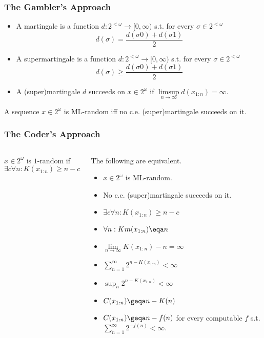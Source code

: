 \documentclass[UTF8,11pt,colorlinks,compress,openany]{beamer}%
\begin{document}
\begin{frame}\frametitle{The Gambler's Approach}
\begin{itemize}
	\item A martingale is a function $d: 2^{<\omega}\to[0,\infty)$ s.t. for every $\sigma\in 2^{<\omega}$
	\[d(\sigma)=\frac{d(\sigma0)+d(\sigma1)}{2}\]
	\item A supermartingale is a function $d: 2^{<\omega}\to[0,\infty)$ s.t. for every $\sigma\in 2^{<\omega}$
	\[d(\sigma)\geq\frac{d(\sigma0)+d(\sigma1)}{2}\]
	\item A (super)martingale $d$ succeeds on $x\in 2^\omega$ if $\limsup\limits_{n\to\infty}d(x_{1:n})=\infty$.
\end{itemize}
\begin{theorem}
A sequence $x\in 2^\omega$ is ML-random iff no c.e. (super)martingale succeeds on it.
\end{theorem}
\end{frame}

\begin{frame}\frametitle{The Coder's Approach}
\setlength\abovedisplayskip{0pt}
\setlength\belowdisplayskip{0pt}
\begin{columns}
\begin{definition}[$1$-Randomness]
$x\in 2^\omega$ is $1$-random if
\[\exists c\forall n: K(x_{1:n})\geq n-c\]
\end{definition}
\begin{theorem}
The following are equivalent.
\begin{itemize}
	\item $x\in 2^\omega$ is ML-random.
	\item No c.e. (super)martingale succeeds on it.
	\item $\exists c\forall n: K(x_{1:n})\geq n-c$
	\item $\forall n: Km(x_{1:n})\eqa n$
	\item $\lim\limits_{n\to\infty}K(x_{1:n})-n=\infty$
	\item $\sum\limits_{n=1}^\infty 2^{n-K(x_{1:n})}<\infty$
	\item $\sup_n 2^{n-K(x_{1:n})}<\infty$
	\item $C(x_{1:n})\geqa n-K(n)$
	\item $C(x_{1:n})\geqa n-f(n)$ for every computable $f$ s.t. $\sum\limits_{n=1}^\infty 2^{-f(n)}<\infty$.
\end{itemize}
\end{theorem}
\end{columns}
\end{frame}
\end{document}
